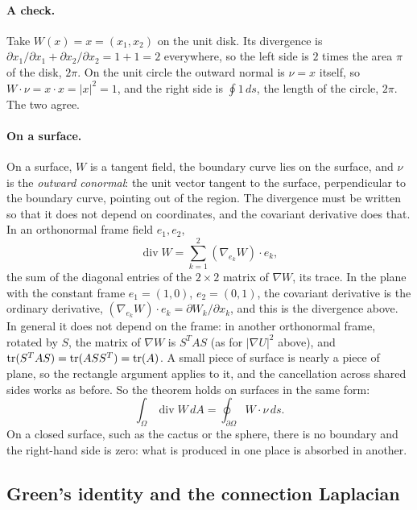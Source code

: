 \paragraph{A check.} Take $W(x) = x = (x_1, x_2)$ on the unit disk. Its divergence is $\partial x_1/\partial x_1 + \partial x_2/\partial x_2 = 1 + 1 = 2$ everywhere, so the left side is $2$ times the area $\pi$ of the disk, $2\pi$. On the unit circle the outward normal is $\nu = x$ itself, so $W\cdot\nu = x\cdot x = |x|^2 = 1$, and the right side is $\oint 1\, ds$, the length of the circle, $2\pi$. The two agree.

\paragraph{On a surface.} On a surface, $W$ is a tangent field, the boundary curve lies on the surface, and $\nu$ is the \emph{outward conormal}: the unit vector tangent to the surface, perpendicular to the boundary curve, pointing out of the region. The divergence must be written so that it does not depend on coordinates, and the covariant derivative does that. In an orthonormal frame field $e_1, e_2$,
\begin{equation*}
\operatorname{div} W = \sum_{k=1}^2 (\nabla_{e_k} W)\cdot e_k ,
\end{equation*}
the sum of the diagonal entries of the $2\times 2$ matrix of $\nabla W$, its trace. In the plane with the constant frame $e_1 = (1, 0)$, $e_2 = (0, 1)$, the covariant derivative is the ordinary derivative, $(\nabla_{e_k} W)\cdot e_k = \partial W_k/\partial x_k$, and this is the divergence above. In general it does not depend on the frame: in another orthonormal frame, rotated by $S$, the matrix of $\nabla W$ is $S^T A S$ (as for $|\nabla U|^2$ above), and $\operatorname{tr}(S^T A S) = \operatorname{tr}(A S S^T) = \operatorname{tr}(A)$. A small piece of surface is nearly a piece of plane, so the rectangle argument applies to it, and the cancellation across shared sides works as before. So the theorem holds on surfaces in the same form:
\begin{equation}
\label{eqn:t1_divergence}
\int_\Omega \operatorname{div} W\, dA = \oint_{\partial\Omega} W\cdot \nu\, ds .
\end{equation}
On a closed surface, such as the cactus or the sphere, there is no boundary and the right-hand side is zero: what is produced in one place is absorbed in another.

\subsection{Green's identity and the connection Laplacian}

